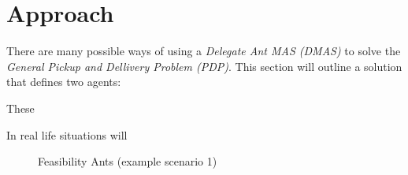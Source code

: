 \section{Approach}
\label{sec:approach}

There are many possible ways of using a \textit{Delegate Ant MAS (DMAS)} to solve the \textit{General Pickup and Dellivery Problem (PDP)}. This section will outline a solution that defines two agents: 

These 

In real life situations will 


\begin{figure}[!h]
        \vspace{0.5pt}
        \begin{center}
       			\setlength\fboxsep{0.5pt}
				\setlength\fboxrule{0.5pt}
		\end{center}
		\caption{Feasibility Ants (example scenario 1)}
		\label{Fig:Radios}
        \vspace{0.5pt}
\end{figure}

